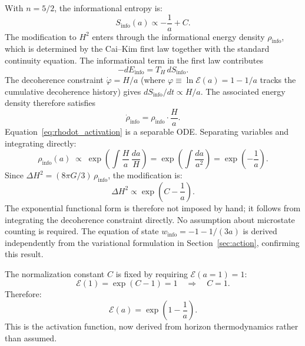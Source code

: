 \documentclass[11pt]{article}
\begin{document}
With $n = 5/2$, the informational entropy is:
\begin{equation}
S_\mathrm{info}(a) \propto -\frac{1}{a} + C.
\end{equation}
The modification to $H^2$ enters through the informational energy density
$\rho_\mathrm{info}$, which is determined by the Cai--Kim first law together
with the standard continuity equation.  The informational term in the first
law contributes
\begin{equation}
-dE_\mathrm{info} = T_H\,dS_\mathrm{info}.
\label{eq:dE_info}
\end{equation}
The decoherence constraint $\dot\varphi = H/a$ (where $\varphi \equiv
\ln\mathcal{E}(a) = 1 - 1/a$ tracks the cumulative decoherence history)
gives $dS_\mathrm{info}/dt \propto H/a$.  The associated energy density
therefore satisfies
\begin{equation}
\dot{\rho}_\mathrm{info} = \rho_\mathrm{info}\cdot\frac{H}{a}.
\label{eq:rhodot_activation}
\end{equation}
Equation~\eqref{eq:rhodot_activation} is a separable ODE.  Separating
variables and integrating directly:
\begin{equation}
\rho_\mathrm{info}(a) \;\propto\;
\exp\!\left(\int \frac{H}{a}\,\frac{da}{H}\right)
= \exp\!\left(\int \frac{da}{a^2}\right)
= \exp\!\left(-\frac{1}{a}\right).
\label{eq:rho_integral}
\end{equation}
Since $\Delta H^2 = (8\pi G/3)\,\rho_\mathrm{info}$, the modification is:
\begin{equation}
\Delta H^2 \propto \exp\!\left(C - \frac{1}{a}\right).
\end{equation}
The exponential functional form is therefore not imposed by hand; it follows
from integrating the decoherence constraint directly.  No assumption about
microstate counting is required.  The equation of state
$w_\mathrm{info} = -1 - 1/(3a)$ is derived independently from the
variational formulation in Section~\ref{sec:action}, confirming this result.

The normalization constant $C$ is fixed by requiring
$\mathcal{E}(a{=}1) = 1$:
\begin{equation}
\mathcal{E}(1) = \exp(C - 1) = 1 \quad\Longrightarrow\quad C = 1.
\end{equation}
Therefore:
\begin{equation}
\boxed{\mathcal{E}(a) = \exp\!\left(1 - \frac{1}{a}\right)}.
\label{eq:activation}
\end{equation}
This is the activation function, now derived from horizon thermodynamics
rather than assumed.
\end{document}
